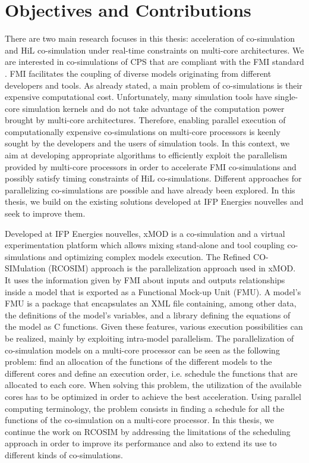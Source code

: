 \section{Objectives and Contributions}

There are two main research focuses in this thesis: acceleration of co-simulation and HiL co-simulation under real-time constraints on multi-core architectures. We are interested in co-simulations of CPS that are compliant with the FMI standard \cite{fmi:2014}. FMI facilitates the coupling of diverse models originating from different developers and tools. As already stated, a main problem of co-simulations is their expensive computational cost. Unfortunately, many simulation tools have single-core simulation kernels and do not take advantage of the computation power brought by multi-core architectures. Therefore, enabling parallel execution of computationally expensive co-simulations on multi-core processors is keenly sought by the developers and the users of simulation tools. In this context, we aim at developing appropriate algorithms to efficiently exploit the parallelism provided by multi-core processors in order to accelerate FMI co-simulations and possibly satisfy timing constraints of HiL co-simulations. Different approaches for parallelizing co-simulations are possible and have already been explored. In this thesis, we build on the existing solutions developed at IFP Energies nouvelles and seek to improve them. 

Developed at IFP Energies nouvelles, xMOD is a co-simulation and a virtual experimentation platform which allows mixing stand-alone and tool coupling co-simulations and optimizing complex models execution. The Refined CO-SIMulation (RCOSIM) approach \cite{benkhaled:2014} is the parallelization approach used in xMOD. It uses the information given by FMI about inputs and outputs relationships inside a model that is exported as a Functional Mock-up Unit (FMU). A model's FMU is a package that encapsulates an XML file containing, among other data, the definitions of the model's variables, and a library defining the equations of the model as C functions. Given these features, various execution possibilities can be realized, mainly by exploiting intra-model parallelism. The parallelization of co-simulation models on a multi-core processor can be seen as the following problem: find an allocation of the functions of the different models to the different cores and define an execution order, i.e. schedule the functions that are allocated to each core. When solving this problem, the utilization of the available cores has to be optimized in order to achieve the best acceleration. Using parallel computing terminology, the problem consists in finding a schedule for all the functions of the co-simulation on a multi-core processor. In this thesis, we continue the work on RCOSIM by addressing the limitations of the scheduling approach in order to improve its performance and also to extend its use to different kinds of co-simulations.

